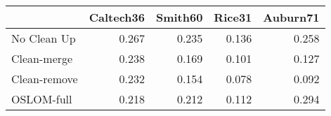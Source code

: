 \begin{tabular}{lrrrr}
\toprule
{} & Caltech36 & Smith60 & Rice31 & Auburn71 \\
\midrule
No Clean Up  &     0.267 &   0.235 &  0.136 &    0.258 \\
Clean-merge  &     0.238 &   0.169 &  0.101 &    0.127 \\
Clean-remove &     0.232 &   0.154 &  0.078 &    0.092 \\
OSLOM-full   &     0.218 &   0.212 &  0.112 &    0.294 \\
\bottomrule
\end{tabular}
